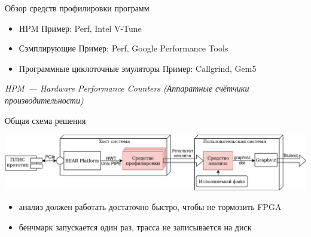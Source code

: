 \documentclass[10pt,aspectratio=169,hyperref={pdftex,unicode},xcolor=dvipsnames]{beamer}
\begin{document}
\begin{frame}{ Обзор средств профилировки программ }
    \begin{itemize}
        \item
            HPM \newline
            Пример: Perf, Intel V-Tune
        \item
            Сэмплирующие \newline
            Пример: Perf, Google Performance Tools
        \item
            Программные циклоточные эмуляторы \newline
            Пример: Callgrind, Gem5
    \end{itemize}



    \textit{
        \footnotesize
        HPM~--- Hardware Performance Counters (Аппаратные счётчики производительности)
    }
\end{frame}

\begin{frame}{ Общая схема решения }
    \begin{center}
        \includegraphics[width=\textwidth,keepaspectratio]{./images/stac_arch.png}
    \end{center}
    \begin{itemize}
        \pause \item анализ должен работать достаточно быстро, чтобы не тормозить FPGA
        \pause \item бенчмарк запускается один раз, трасса не записывается на диск
    \end{itemize}
\end{frame}
\end{document}
